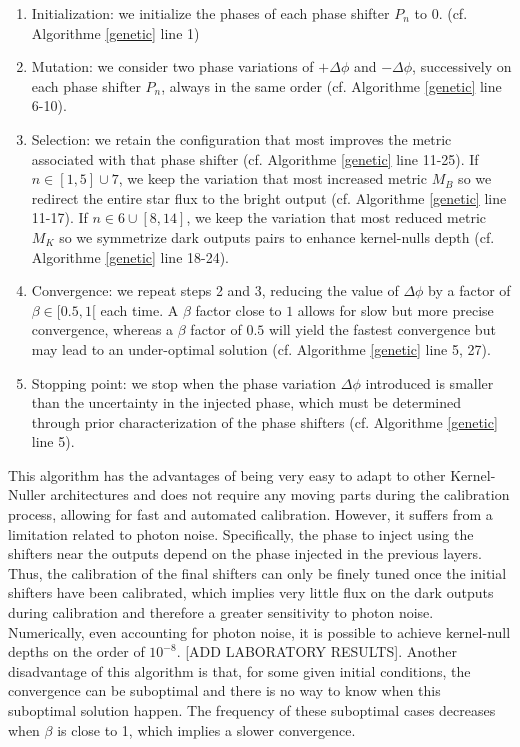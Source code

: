 \documentclass{aa}
\begin{document}
            \begin{enumerate}
                \item Initialization: we initialize the phases of each phase shifter $P_n$ to 0.  (cf. Algorithme \ref{genetic} line 1)
                \item Mutation: we consider two phase variations of $+ \Delta \phi$ and $- \Delta \phi$, successively on each phase shifter $P_n$, always in the same order  (cf. Algorithme \ref{genetic} line 6-10).
                \item Selection: we retain the configuration that most improves the metric associated with that phase shifter (cf. Algorithme \ref{genetic} line 11-25).
                    \subitem If $n \in [1, 5] \cup 7$, we keep the variation that most increased metric $M_B$ so we redirect the entire star flux to the bright output  (cf. Algorithme \ref{genetic} line 11-17).
                    \subitem If $n \in 6 \cup [8, 14]$, we keep the variation that most reduced metric $M_K$ so we symmetrize dark outputs pairs to enhance kernel-nulls depth  (cf. Algorithme \ref{genetic} line 18-24).
                \item Convergence: we repeat steps 2 and 3, reducing the value of $\Delta \phi$ by a factor of $\beta \in [0.5,1[$ each time. A $\beta$ factor close to $1$ allows for slow but more precise convergence, whereas a $\beta$ factor of $0.5$ will yield the fastest convergence but may lead to an under-optimal solution  (cf. Algorithme \ref{genetic} line 5, 27).
                \item Stopping point: we stop when the phase variation $\Delta \phi$ introduced is smaller than the uncertainty in the injected phase, which must be determined through prior characterization of the phase shifters  (cf. Algorithme \ref{genetic} line 5).
            \end{enumerate}

            This algorithm has the advantages of being very easy to adapt to other Kernel-Nuller architectures and does not require any moving parts during the calibration process, allowing for fast and automated calibration. However, it suffers from a limitation related to photon noise. Specifically, the phase to inject using the shifters near the outputs depend on the phase injected in the previous layers. Thus, the calibration of the final shifters can only be finely tuned once the initial shifters have been calibrated, which implies very little flux on the dark outputs during calibration and therefore a greater sensitivity to photon noise. Numerically, even accounting for photon noise, it is possible to achieve kernel-null depths on the order of $10^{-8}$. [ADD LABORATORY RESULTS]. Another disadvantage of this algorithm is that, for some given initial conditions, the convergence can be suboptimal and there is no way to know when this suboptimal solution happen. The frequency of these suboptimal cases decreases when $\beta$ is close to 1, which implies a slower convergence.
\end{document}
